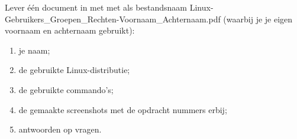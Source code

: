 Lever \'e\'en document in met met als bestandsnaam Linux-Gebruikers\_Groepen\_Rechten-Voornaam\_Achternaam.pdf (waarbij je je eigen voornaam en achternaam gebruikt):

\begin{enumerate}
\item je naam;
\item de gebruikte Linux-distributie;
\item de gebruikte commando's;
\item de gemaakte screenshots met de opdracht nummers erbij;
\item antwoorden op vragen.
\end{enumerate}

